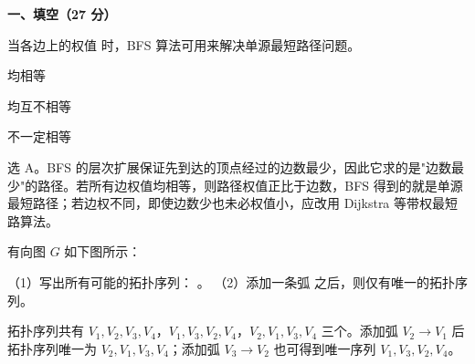 

\textbf{一、填空（27 分）}
\begin{question}
当各边上的权值 \blank 时，BFS 算法可用来解决单源最短路径问题。
\begin{choiceoptions}[2]
  \item 均相等
  \item 均互不相等
  \item 不一定相等
\end{choiceoptions}
\begin{solution}
选 A。BFS 的层次扩展保证先到达的顶点经过的边数最少，因此它求的是"边数最少"的路径。若所有边权值均相等，则路径权值正比于边数，BFS 得到的就是单源最短路径；若边权不同，即使边数少也未必权值小，应改用 Dijkstra 等带权最短路算法。
\end{solution}
\end{question}

\begin{question}
有向图 $G$ 如下图所示：

\begin{center}
\end{center}

（1）写出所有可能的拓扑序列： \blank。
（2）添加一条弧 \blank 之后，则仅有唯一的拓扑序列。
\begin{solution}
拓扑序列共有 $V_1,V_2,V_3,V_4$，$V_1,V_3,V_2,V_4$，$V_2,V_1,V_3,V_4$ 三个。添加弧 $V_2\to V_1$ 后拓扑序列唯一为 $V_2,V_1,V_3,V_4$；添加弧 $V_3\to V_2$ 也可得到唯一序列 $V_1,V_3,V_2,V_4$。
\end{solution}
\end{question}

